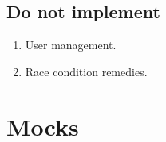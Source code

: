 \documentclass{article}
\begin{document}
	\subsection{Do not implement}

	\begin{enumerate}
		\item User management.
		\item Race condition remedies.
	\end{enumerate}

	\section{Mocks}

	\vspace{0.5cm}

	\begin{center}
	\end{center}

	\begin{center}
	\end{center}


\end{document}
